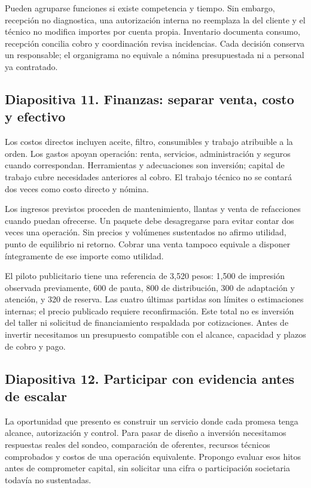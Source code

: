 {Pueden agruparse funciones si existe competencia y tiempo. Sin embargo, recepción no diagnostica, una autorización interna no reemplaza la del cliente y el técnico no modifica importes por cuenta propia. Inventario documenta consumo, recepción concilia cobro y coordinación revisa incidencias. Cada decisión conserva un responsable; el organigrama no equivale a nómina presupuestada ni a personal ya contratado.

\subsection{Diapositiva 11. Finanzas: separar venta, costo y efectivo}
Los costos directos incluyen aceite, filtro, consumibles y trabajo atribuible a la orden. Los gastos apoyan operación: renta, servicios, administración y seguros cuando correspondan. Herramientas y adecuaciones son inversión; capital de trabajo cubre necesidades anteriores al cobro. El trabajo técnico no se contará dos veces como costo directo y nómina.

Los ingresos previstos proceden de mantenimiento, llantas y venta de refacciones cuando puedan ofrecerse. Un paquete debe desagregarse para evitar contar dos veces una operación. Sin precios y volúmenes sustentados no afirmo utilidad, punto de equilibrio ni retorno. Cobrar una venta tampoco equivale a disponer íntegramente de ese importe como utilidad.

El piloto publicitario tiene una referencia de 3,520 pesos: 1,500 de impresión observada previamente, 600 de pauta, 800 de distribución, 300 de adaptación y atención, y 320 de reserva. Las cuatro últimas partidas son límites o estimaciones internas; el precio publicado requiere reconfirmación. Este total no es inversión del taller ni solicitud de financiamiento respaldada por cotizaciones. Antes de invertir necesitamos un presupuesto compatible con el alcance, capacidad y plazos de cobro y pago.

\subsection{Diapositiva 12. Participar con evidencia antes de escalar}
La oportunidad que presento es construir un servicio donde cada promesa tenga alcance, autorización y control. Para pasar de diseño a inversión necesitamos respuestas reales del sondeo, comparación de oferentes, recursos técnicos comprobados y costos de una operación equivalente. Propongo evaluar esos hitos antes de comprometer capital, sin solicitar una cifra o participación societaria todavía no sustentadas.

}
